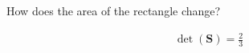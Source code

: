 How does the area of the rectangle change?

\begin{solution}
    \begin{align*}
        \det\left(\boldsymbol{S}\right) = \frac{2}{3}
    \end{align*}
\end{solution}